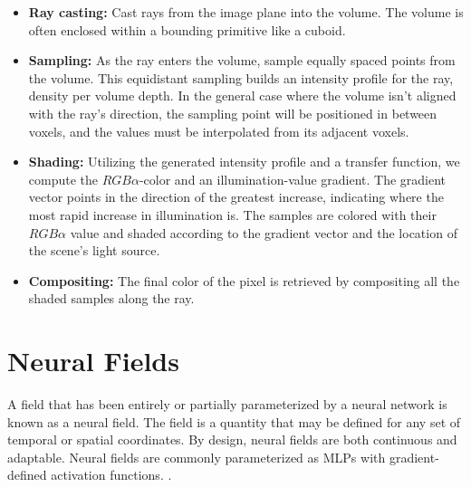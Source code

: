\begin{itemize}
    \item \textbf{Ray casting:} Cast rays from the image plane into the volume. The volume is often enclosed within a bounding primitive like a cuboid.
    \item \textbf{Sampling:} As the ray enters the volume, sample equally spaced points from the volume. This equidistant sampling builds an intensity profile for the ray, density per volume depth. In the general case where the volume isn't aligned with the ray's direction, the sampling point will be positioned in between voxels, and the values must be interpolated from its adjacent voxels.
    \item \textbf{Shading:} Utilizing the generated intensity profile and a transfer function, we compute the $RGB\alpha$-color and an illumination-value gradient. The gradient vector points in the direction of the greatest increase, indicating where the most rapid increase in illumination is. The samples are colored with their $RGB\alpha$ value and shaded according to the gradient vector and the location of the scene's light source.
    \item \textbf{Compositing:} The final color of the pixel is retrieved by compositing all the shaded samples along the ray. 
\end{itemize}



\begin{comment}
\subsection{Alpha compositing}
Alpha compositing is the process of combining one image with a background to create the appearance of partial or full transparency \cite{wiki:Alpha_compositing}.

\subsection{Ray marching}
\end{comment}



\section{Neural Fields} %
A field that has been entirely or partially parameterized by a neural network is known as a neural field. The field is a quantity that may be defined for any set of temporal or spatial coordinates. By design, neural fields are both continuous and adaptable. Neural fields are commonly parameterized as MLPs with gradient-defined activation functions. \cite{xie_neural_2022}.

